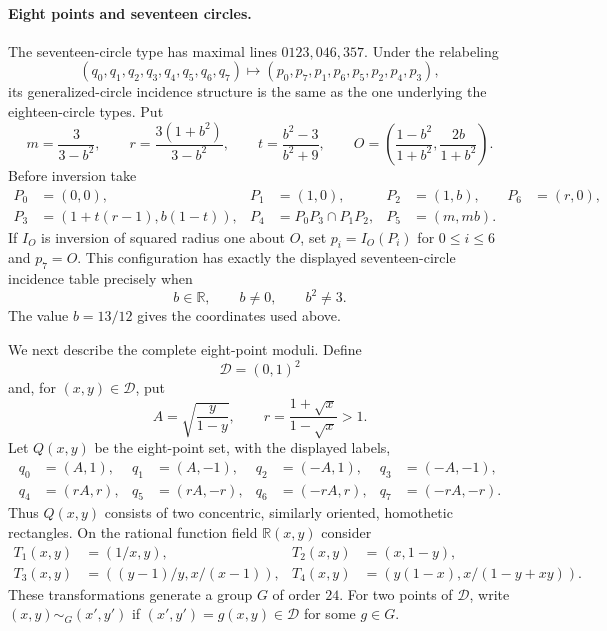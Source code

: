 \documentclass[11pt,a4paper]{article}
\theoremstyle{definition}
\begin{document}
\paragraph{Eight points and seventeen circles.}\leavevmode\par
The seventeen-circle type has maximal lines $0123,046,357$.  Under the
relabeling
\[
(q_0,q_1,q_2,q_3,q_4,q_5,q_6,q_7)
\longmapsto(p_0,p_7,p_1,p_6,p_5,p_2,p_4,p_3),
\]
its generalized-circle incidence structure is the same as the one underlying
the eighteen-circle types.  Put
\[
m=\frac3{3-b^2},\qquad r=\frac{3(1+b^2)}{3-b^2},\qquad
t=\frac{b^2-3}{b^2+9},\qquad
O=\left(\frac{1-b^2}{1+b^2},\frac{2b}{1+b^2}\right).
\]
Before inversion take
\[
\begin{aligned}
P_0&=(0,0),&P_1&=(1,0),&P_2&=(1,b),&P_6&=(r,0),\\
P_3&=(1+t(r-1),b(1-t)),&
P_4&=P_0P_3\cap P_1P_2,&P_5&=(m,mb).
\end{aligned}
\]
If $I_O$ is inversion of squared radius one about $O$, set
$p_i=I_O(P_i)$ for $0\le i\le6$ and $p_7=O$.  This configuration has exactly
the displayed seventeen-circle incidence table precisely when
\[
 b\in\mathbb R,\qquad b\ne0,\qquad b^2\ne3.
\]
The value $b=13/12$ gives the coordinates used above.

We next describe the complete eight-point moduli.  Define
\[
 \mathcal D=(0,1)^2
\]
and, for $(x,y)\in\mathcal D$, put
\[
 A=\sqrt{\frac{y}{1-y}},\qquad
 r=\frac{1+\sqrt{x}}{1-\sqrt{x}}>1.
\]
Let $Q(x,y)$ be the eight-point set, with the displayed labels,
\begin{equation}\label{eq:rectangle-normal-form-en}
\begin{aligned}
q_0&=(A,1),&q_1&=(A,-1),&q_2&=(-A,1),&q_3&=(-A,-1),\\
q_4&=(rA,r),&q_5&=(rA,-r),&q_6&=(-rA,r),&q_7&=(-rA,-r).
\end{aligned}
\end{equation}
Thus $Q(x,y)$ consists of two concentric, similarly oriented, homothetic
rectangles.  On the rational function field $\mathbb R(x,y)$ consider
\begin{equation}\label{eq:n8-moduli-generators-en}
\begin{aligned}
T_1(x,y)&=(1/x,y),&
T_2(x,y)&=(x,1-y),\\
T_3(x,y)&=((y-1)/y,x/(x-1)),&
T_4(x,y)&=(y(1-x),x/(1-y+xy)).
\end{aligned}
\end{equation}
These transformations generate a group $G$ of order $24$.  For two points of
$\mathcal D$, write $(x,y)\sim_G(x',y')$ if
$(x',y')=g(x,y)\in\mathcal D$ for some $g\in G$.
\end{document}
